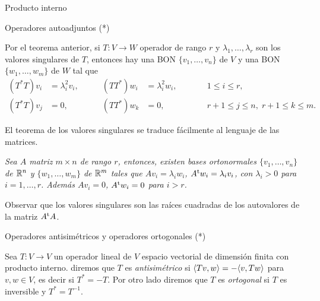 \begin{chapter}{Producto interno}
\begin{section}{Operadores autoadjuntos (*)}
        \begin{obs}\label{tvs-matrices}
        Por  el teorema anterior, si $T: V \to W$ operador de rango $r$ y $\lambda_1,\ldots,\lambda_r$ son los valores singulares de $T$, entonces
        hay una BON  $\{v_1,\ldots,v_n\}$ de $V$ y una BON $\{w_1,\ldots,w_m\}$ de $W$ tal que
        \begin{align*}
            (T^*T)v_i &= \lambda_i^2 v_i,&\qquad (TT^*)w_i &= \lambda_i^2 w_i,& \qquad &1 \le i \le r, \\
            (T^*T)v_j &= 0,&\qquad (TT^*)w_k &= 0,& \qquad &r+1 \le j \le n,\; r+1 \le k \le m.
        \end{align*}
        \end{obs}
        
        \begin{obs*}
            El teorema de los valores singulares se traduce fácilmente al lenguaje de las matrices.
            
            \textit{Sea $A$ matriz $m \times n$ de rango $r$, entonces, existen bases ortonormales $\{v_1,\ldots,v_n\}$ de $\mathbb R^n$ y $\{w_1,\ldots,w_m\}$ de $\mathbb R^m$ tales que $Av_i = \lambda_i w_i$,  $A^{{\operatorname{t}}}w_i = \lambda_i v_i$, con $\lambda_i >0$ para $i=1,\ldots,r$. Además $Av_i = 0$,  $A^{{\operatorname{t}}}w_i = 0$ para $i > r$. }
            
            Observar que los valores singulares son las raíces cuadradas de los autovalores de la matriz $A^{{\operatorname{t}}}A$. 
        \end{obs*}
        
        
        
        
        \end{section}
        
        \begin{section}{Operadores antisim\'etricos y operadores ortogonales (*)}
            
        \begin{definicion}
            Sea $T:V\to V$ un operador lineal de $V$  espacio vectorial de dimensión finita con producto interno. diremos que $T$  es \textit{antisimétrico} si $\langle Tv,w \rangle = -\langle v,Tw \rangle$ para $v,w \in V$,  es decir si $T^* = -T$. Por otro lado diremos que $T$ es \textit{ortogonal} si $T$ es inversible y $T^* = T^{-1}$. 
        \end{definicion}	
        

\end{section}
\end{chapter}
